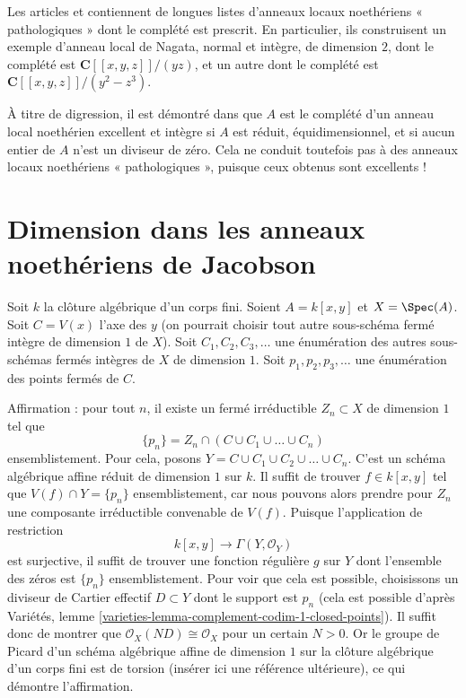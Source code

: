 \medskip\noindent
Les articles \cite{Nishimura-few} et \cite{Nishimura-few-II}
contiennent de longues listes d'anneaux locaux
noethériens « pathologiques » dont le complété est prescrit. En particulier, ils construisent
un exemple d'anneau local de Nagata, normal et intègre, de dimension $2$, dont le
complété est $\mathbf{C}[[x, y, z]]/(yz)$, et un autre dont le complété
est $\mathbf{C}[[x, y, z]]/(y^2 - z^3)$.

\medskip\noindent
À titre de digression, il est démontré dans \cite{Loepp} que $A$ est le complété d'un
anneau local noethérien excellent et intègre si $A$ est réduit, équidimensionnel,
et si aucun entier de $A$ n'est un diviseur de zéro. Cela ne conduit toutefois pas
à des anneaux locaux noethériens « pathologiques », puisque ceux obtenus sont excellents !




\section{Dimension dans les anneaux noethériens de Jacobson}
\label{section-noetherian-jacobson}

\noindent
Soit $k$ la clôture algébrique d'un corps fini.
Soient $A = k[x, y]$ et $X = \Spec(A)$.
Soit $C = V(x)$ l'axe des $y$ (on pourrait choisir tout autre
sous-schéma fermé intègre de dimension $1$ de $X$).
Soit $C_1, C_2, C_3, \ldots$ une énumération
des autres sous-schémas fermés intègres de $X$ de dimension $1$.
Soit $p_1, p_2, p_3, \ldots$ une
énumération des points fermés de $C$.

\medskip\noindent
Affirmation : pour tout $n$, il existe un fermé irréductible
$Z_n \subset X$ de dimension $1$ tel que
$$
\{p_n\} = Z_n \cap (C \cup C_1 \cup \ldots \cup C_n)
$$
ensemblistement. Pour cela, posons
$Y = C \cup C_1 \cup C_2 \cup \ldots \cup C_n$.
C'est un schéma algébrique affine réduit de dimension $1$ sur $k$.
Il suffit de trouver $f \in k[x, y]$ tel que $V(f) \cap  Y = \{p_n\}$
ensemblistement, car nous pouvons alors prendre pour $Z_n$ une composante
irréductible convenable de $V(f)$. Puisque l'application de restriction
$$
k[x, y] \longrightarrow \Gamma(Y, \mathcal{O}_Y)
$$
est surjective, il suffit de trouver une fonction régulière $g$ sur $Y$
dont l'ensemble des zéros est $\{p_n\}$ ensemblistement.
Pour voir que cela est possible, choisissons un diviseur de Cartier effectif
$D \subset Y$ dont le support est $p_n$ (cela est possible d'après
Variétés, lemme \ref{varieties-lemma-complement-codim-1-closed-points}).
Il suffit donc de montrer que $\mathcal{O}_X(ND) \cong \mathcal{O}_X$
pour un certain $N > 0$. Or le groupe de Picard d'un schéma algébrique
affine de dimension $1$ sur la clôture algébrique d'un corps fini est de torsion
(insérer ici une référence ultérieure), ce qui démontre l'affirmation.

